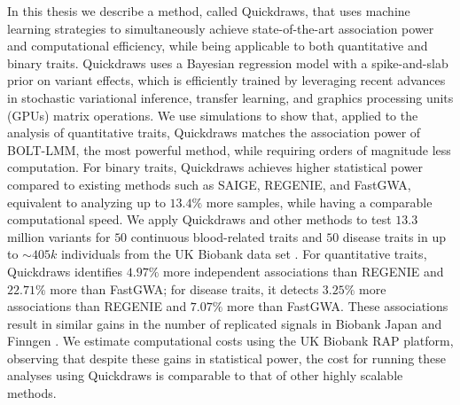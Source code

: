 %
In this thesis we describe a method, called Quickdraws, that uses machine learning strategies to simultaneously achieve state-of-the-art association power and computational efficiency, while being applicable to both quantitative and binary traits.
%
%
Quickdraws uses a Bayesian regression model with a spike-and-slab prior on variant effects, which is efficiently trained by leveraging recent advances in stochastic variational inference, transfer learning, and graphics processing units (GPUs) matrix operations.
%
We use simulations to show that, applied to the analysis of quantitative traits, Quickdraws matches the association power of BOLT-LMM, the most powerful method, while requiring orders of magnitude less computation. 
%
For binary traits, Quickdraws achieves higher statistical power compared to existing methods such as SAIGE, REGENIE, and FastGWA, equivalent to analyzing up to $13.4\%$ more samples, while having a comparable computational speed.
%
We apply Quickdraws and other methods to test $13.3$ million variants for $50$ continuous blood-related traits and $50$ disease traits in up to ${\sim}405k$ individuals from the UK Biobank data set \cite{bycroft2018uk}.
%
For quantitative traits, Quickdraws identifies $4.97\%$ more independent associations than REGENIE and $22.71\%$ more than FastGWA; for disease traits, it detects $3.25\%$ more associations than REGENIE and $7.07\%$ more than FastGWA.
%
These associations result in similar gains in the number of replicated signals in Biobank Japan \cite{nagai2017overview} and Finngen \cite{kurki2023finngen}.
%
We estimate computational costs using the UK Biobank RAP platform, observing that despite these gains in statistical power, the cost for running these analyses using Quickdraws is comparable to that of other highly scalable methods.


